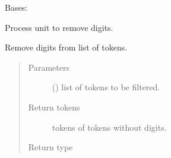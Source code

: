 \documentclass[letterpaper,10pt,english]{sphinxmanual}
\begin{document}
\begin{fulllineitems}
\label{\detokenize{matchzoo:matchzoo.preprocessors.DigitRemovalUnit}}
Bases: {\hyperref[\detokenize{matchzoo:matchzoo.preprocessors.ProcessorUnit}]{}}

Process unit to remove digits.

\begin{fulllineitems}
\label{\detokenize{matchzoo:matchzoo.preprocessors.DigitRemovalUnit.transform}}
Remove digits from list of tokens.
\begin{quote}\begin{description}
\item[{Parameters}] \leavevmode
{} () \textendash{} list of tokens to be filtered.

\item[{Return tokens}] \leavevmode
tokens of tokens without digits.

\item[{Return type}] \leavevmode
{}

\end{description}\end{quote}

\end{fulllineitems}


\end{fulllineitems}

\end{document}
